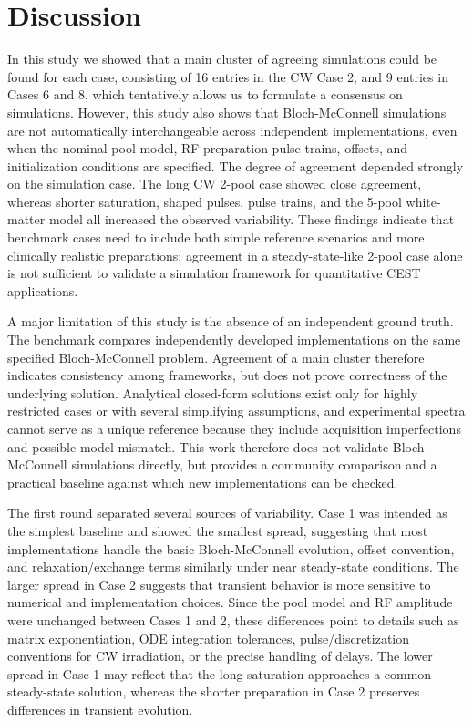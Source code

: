 \documentclass[11pt,a4paper]{article}
\begin{document}
\section{Discussion}\label{Diss}
In this study we showed that a main cluster of agreeing simulations could be found for each case, consisting of 16 entries in the CW Case 2, and 9 entries in Cases 6 and 8, which tentatively allows us to formulate a consensus on simulations. 
However, this study also shows that Bloch-McConnell simulations are not automatically interchangeable across independent implementations, even when the nominal pool model, RF preparation pulse trains, offsets, and initialization conditions are specified. The degree of agreement depended strongly on the simulation case. The long CW 2-pool case showed close agreement, whereas shorter saturation, shaped pulses, pulse trains, and the 5-pool white-matter model all increased the observed variability. These findings indicate that benchmark cases need to include both simple reference scenarios and more clinically realistic preparations; agreement in a steady-state-like 2-pool case alone is not sufficient to validate a simulation framework for quantitative CEST applications.

A major limitation of this study is the absence of an independent ground truth. 
The benchmark compares independently developed implementations on the same specified Bloch-McConnell problem. 
Agreement of a main cluster therefore indicates consistency among frameworks, but does not prove correctness of the underlying solution. Analytical closed-form solutions exist only for highly restricted cases or with several simplifying assumptions, and experimental spectra cannot serve as a unique reference because they include acquisition imperfections and possible model mismatch.
This work therefore does not validate Bloch-McConnell simulations directly, but provides a community comparison and a practical baseline against which new implementations can be checked.

The first round separated several sources of variability. Case 1 was intended as the simplest baseline and showed the smallest spread, suggesting that most implementations handle the basic Bloch-McConnell evolution, offset convention, and relaxation/exchange terms similarly under near steady-state conditions. 
The larger spread in Case 2 suggests that transient behavior is more sensitive to numerical and implementation choices. Since the pool model and RF amplitude were unchanged between Cases 1 and 2, these differences point to details such as matrix exponentiation, ODE integration tolerances, pulse/discretization conventions for CW irradiation, or the precise handling of delays. The lower spread in Case 1 may reflect that the long saturation approaches a common steady-state solution, whereas the shorter preparation in Case 2 preserves differences in transient evolution.
\end{document}
